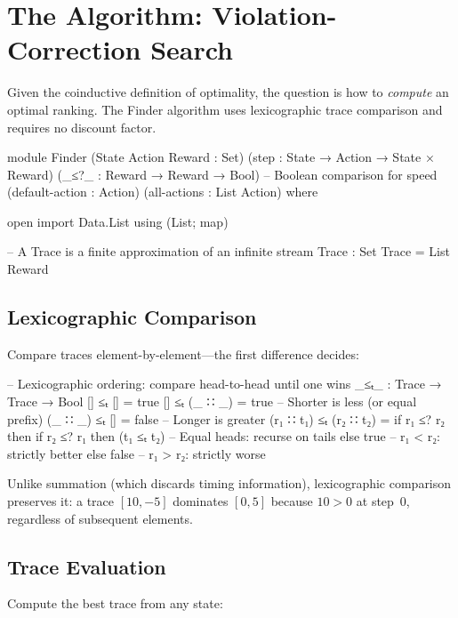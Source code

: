 \documentclass[9pt,a4paper]{article}
\theoremstyle{plain}
\theoremstyle{definition}
\theoremstyle{remark}
\begin{document}
\section{The Algorithm: Violation-Correction Search}

Given the coinductive definition of optimality, the question is how to \emph{compute} an optimal ranking.  The Finder algorithm uses lexicographic trace comparison and requires no discount factor.

\begin{code}
module Finder
  (State Action Reward : Set)
  (step                : State → Action → State × Reward)
  (_≤?_                : Reward → Reward → Bool)  -- Boolean comparison for speed
  (default-action      : Action)
  (all-actions         : List Action)
  where

  open import Data.List using (List; map)

  -- A Trace is a finite approximation of an infinite stream
  Trace : Set
  Trace = List Reward
\end{code}

\subsection{Lexicographic Comparison}

Compare traces element-by-element---the first difference decides:

\begin{code}
  -- Lexicographic ordering: compare head-to-head until one wins
  _≤ₜ_ : Trace → Trace → Bool
  []       ≤ₜ []       = true
  []       ≤ₜ (_ ∷ _)  = true   -- Shorter is less (or equal prefix)
  (_ ∷ _)  ≤ₜ []       = false  -- Longer is greater
  (r₁ ∷ t₁) ≤ₜ (r₂ ∷ t₂) =
    if r₁ ≤? r₂ then
      if r₂ ≤? r₁ then (t₁ ≤ₜ t₂)  -- Equal heads: recurse on tails
      else true                      -- r₁ < r₂: strictly better
    else false                       -- r₁ > r₂: strictly worse
\end{code}

\noindent Unlike summation (which discards timing information), lexicographic comparison preserves it: a trace $[10, -5]$ dominates $[0, 5]$ because $10 > 0$ at step~$0$, regardless of subsequent elements.

\subsection{Trace Evaluation}

Compute the best trace from any state:
\end{document}
